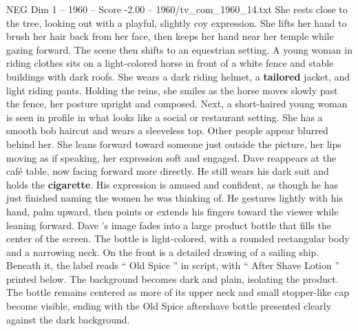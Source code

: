 \begin{textsample}{NEG Dim 1 – 1960 – Score -2.00 – 1960/tv\_com\_1960\_14.txt}
She rests close to the tree, looking out with a playful, slightly coy expression.
She lifts her hand to brush her hair back from her face, then keeps her hand near her temple while gazing forward.
The scene then shifts to an equestrian setting.
A young woman in riding clothes sits on a light-colored horse in front of a white fence and stable buildings with dark roofs.
She wears a dark riding helmet, a \textbf{tailored} jacket, and light riding pants.
Holding the reins, she smiles as the horse moves slowly past the fence, her posture upright and composed.
Next, a short-haired young woman is seen in profile in what looks like a social or restaurant setting.
She has a smooth bob haircut and wears a sleeveless top.
Other people appear blurred behind her.
She leans forward toward someone just outside the picture, her lips moving as if speaking, her expression soft and engaged.
Dave reappears at the café table, now facing forward more directly.
He still wears his dark suit and holds the \textbf{cigarette}.
His expression is amused and confident, as though he has just finished naming the women he was thinking of.
He gestures lightly with his hand, palm upward, then points or extends his fingers toward the viewer while leaning forward.
Dave ’s image fades into a large product bottle that fills the center of the screen.
The bottle is light-colored, with a rounded rectangular body and a narrowing neck.
On the front is a detailed drawing of a sailing ship.
Beneath it, the label reads “ Old Spice ” in script, with “ After Shave Lotion ” printed below.
The background becomes dark and plain, isolating the product.
The bottle remains centered as more of its upper neck and small stopper-like cap become visible, ending with the Old Spice aftershave bottle presented clearly against the dark background.

\end{textsample}
